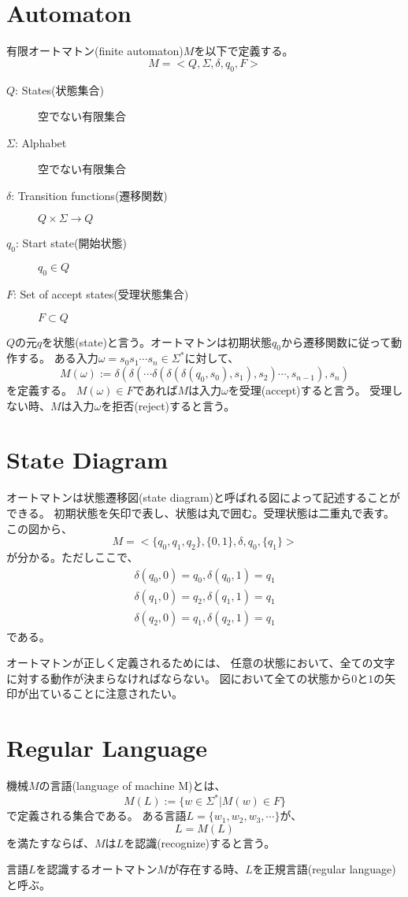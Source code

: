 \documentclass[b5paper,fleqn]{ltjsarticle}
\newcommand\al[1]{\begin{align*}#1\end{align*}}
\begin{document}
\section{Automaton}
有限オートマトン(finite automaton)$M$を以下で定義する。
\[M=<Q,\Sigma,\delta,q_0,F>\]
\begin{description}
\item[$Q$: States(状態集合)] 空でない有限集合
\item[$\Sigma$: Alphabet] 空でない有限集合
\item[$\delta$: Transition functions(遷移関数)] $Q\times\Sigma\rightarrow Q$
\item[$q_0$: Start state(開始状態)] $q_0\in Q$
\item[$F$: Set of accept states(受理状態集合)] $F\subset Q$
\end{description}
$Q$の元$q$を状態(state)と言う。オートマトンは初期状態$q_0$から遷移関数に従って動作する。
ある入力$\omega=s_0s_1\cdots s_n\in\Sigma^*$に対して、
\[M(\omega):=\delta(\delta(\cdots\delta(\delta(\delta(q_0,s_0),s_1),s_2)\cdots,s_{n-1}),s_n)\]を定義する。
$M(\omega)\in F$であれば$M$は入力$\omega$を受理(accept)すると言う。
受理しない時、$M$は入力$\omega$を拒否(reject)すると言う。

\section{State Diagram}
オートマトンは状態遷移図(state diagram)と呼ばれる図によって記述することができる。
初期状態を矢印で表し、状態は丸で囲む。受理状態は二重丸で表す。
\vskip10pt
\vskip5pt
この図から、
\[M=<\{q_0,q_1,q_2\},\{0,1\},\delta,q_0,\{q_1\}>\]
が分かる。ただしここで、
\al{\delta(q_0,0)=q_0, \delta(q_0,1)=q_1\\
\delta(q_1,0)=q_2, \delta(q_1,1)=q_1\\
\delta(q_2,0)=q_1, \delta(q_2,1)=q_1
}である。\par
オートマトンが正しく定義されるためには、
任意の状態において、全ての文字に対する動作が決まらなければならない。
図において全ての状態から$0$と$1$の矢印が出ていることに注意されたい。

\section{Regular Language}
機械$M$の言語(language of machine M)とは、
\[M(L):=\{w\in \Sigma^*|M(w)\in F\}\]
で定義される集合である。
ある言語$L=\{w_1,w_2,w_3,\cdots\}$が、
\[L=M(L)\]
を満たすならば、$M$は$L$を認識(recognize)すると言う。\par
言語$L$を認識するオートマトン$M$が存在する時、$L$を正規言語(regular language)と呼ぶ。
\end{document}
